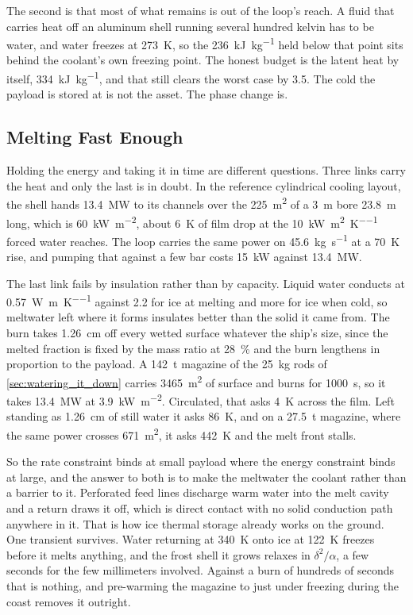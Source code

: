 \documentclass{article}
\begin{document}
The second is that most of what remains is out of the loop's reach. A fluid that carries heat off an aluminum shell running several hundred kelvin has to be water, and water freezes at \SI{273}{\kelvin}, so the \SI{236}{\kilo\joule\per\kilogram} held below that point sits behind the coolant's own freezing point. The honest budget is the latent heat by itself, \SI{334}{\kilo\joule\per\kilogram}, and that still clears the worst case by \num{3.5}. The cold the payload is stored at is not the asset. The phase change is.

\subsection*{Melting Fast Enough}
Holding the energy and taking it in time are different questions. Three links carry the heat and only the last is in doubt. In the reference cylindrical cooling layout, the shell hands \SI{13.4}{\mega\watt} to its channels over the \SI{225}{\square\meter} of a \SI{3}{\meter} bore \SI{23.8}{\meter} long, which is \SI{60}{\kilo\watt\per\square\meter}, about \SI{6}{\kelvin} of film drop at the \SI{10}{\kilo\watt\per\square\meter\per\kelvin} forced water reaches. The loop carries the same power on \SI{45.6}{\kilo\gram\per\second} at a \SI{70}{\kelvin} rise, and pumping that against a few bar costs \SI{15}{\kilo\watt} against \SI{13.4}{\mega\watt}.

The last link fails by insulation rather than by capacity. Liquid water conducts at \SI{0.57}{\watt\per\meter\per\kelvin} against \SI{2.2}{} for ice at melting and more for ice when cold, so meltwater left where it forms insulates better than the solid it came from. The burn takes \SI{1.26}{\centi\meter} off every wetted surface whatever the ship's size, since the melted fraction is fixed by the mass ratio at \SI{28}{\percent} and the burn lengthens in proportion to the payload. A \SI{142}{\tonne} magazine of the \SI{25}{\kilogram} rods of \autoref{sec:watering_it_down} carries \SI{3465}{\square\meter} of surface and burns for \SI{1000}{\second}, so it takes \SI{13.4}{\mega\watt} at \SI{3.9}{\kilo\watt\per\square\meter}. Circulated, that asks \SI{4}{\kelvin} across the film. Left standing as \SI{1.26}{\centi\meter} of still water it asks \SI{86}{\kelvin}, and on a \SI{27.5}{\tonne} magazine, where the same power crosses \SI{671}{\square\meter}, it asks \SI{442}{\kelvin} and the melt front stalls.

So the rate constraint binds at small payload where the energy constraint binds at large, and the answer to both is to make the meltwater the coolant rather than a barrier to it. Perforated feed lines discharge warm water into the melt cavity and a return draws it off, which is direct contact with no solid conduction path anywhere in it. That is how ice thermal storage already works on the ground. One transient survives. Water returning at \SI{340}{\kelvin} onto ice at \SI{122}{\kelvin} freezes before it melts anything, and the frost shell it grows relaxes in $\delta^2/\alpha$, a few seconds for the few millimeters involved. Against a burn of hundreds of seconds that is nothing, and pre-warming the magazine to just under freezing during the coast removes it outright.
\end{document}
